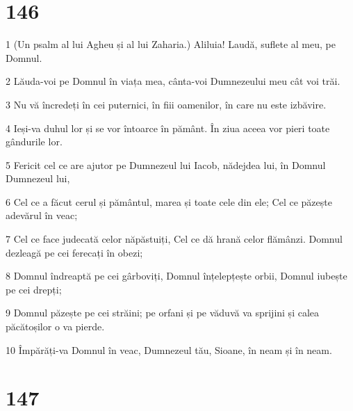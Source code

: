 \chapter{146}

\par 1 (Un psalm al lui Agheu și al lui Zaharia.) Aliluia! Laudă, suflete al meu, pe Domnul.
\par 2 Lăuda-voi pe Domnul în viața mea, cânta-voi Dumnezeului meu cât voi trăi.
\par 3 Nu vă încredeți în cei puternici, în fiii oamenilor, în care nu este izbăvire.
\par 4 Ieși-va duhul lor și se vor întoarce în pământ. În ziua aceea vor pieri toate gândurile lor.
\par 5 Fericit cel ce are ajutor pe Dumnezeul lui Iacob, nădejdea lui, în Domnul Dumnezeul lui,
\par 6 Cel ce a făcut cerul și pământul, marea și toate cele din ele; Cel ce păzește adevărul în veac;
\par 7 Cel ce face judecată celor năpăstuiți, Cel ce dă hrană celor flămânzi. Domnul dezleagă pe cei ferecați în obezi;
\par 8 Domnul îndreaptă pe cei gârboviți, Domnul înțelepțește orbii, Domnul iubește pe cei drepți;
\par 9 Domnul păzește pe cei străini; pe orfani și pe văduvă va sprijini și calea păcătoșilor o va pierde.
\par 10 Împărăți-va Domnul în veac, Dumnezeul tău, Sioane, în neam și în neam.

\chapter{147}

